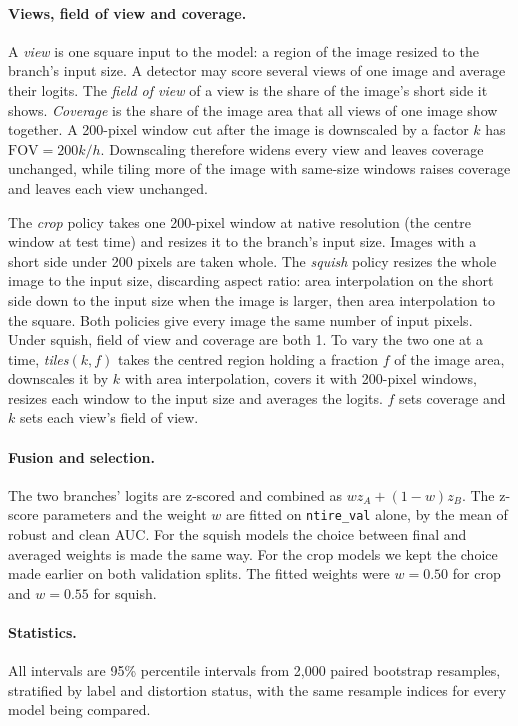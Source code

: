 \documentclass[letterpaper]{article} %
\newcommand{\fov}{\mathrm{FOV}}
\begin{document}
\paragraph{Views, field of view and coverage.} A \emph{view} is one
square input to the model: a region of the image resized to the branch's input
size. A detector may score several views of one image and average their
logits. The \emph{field of view} of a view is the share of the image's short
side it shows. \emph{Coverage} is the share of the image area that all views
of one image show together. A 200-pixel window cut after the image is
downscaled by a factor $k$ has $\fov = 200k/h$. Downscaling therefore widens
every view and leaves coverage unchanged, while tiling more of the image with
same-size windows raises coverage and leaves each view unchanged.

The \emph{crop} policy takes one 200-pixel window at native resolution (the
centre window at test time) and resizes it to the branch's input size. Images
with a short side under 200 pixels are taken whole. The \emph{squish} policy
resizes the whole image to the input size, discarding aspect ratio: area
interpolation on the short side down to the input size when the image is
larger, then area interpolation to the square. Both policies give every image
the same number of input pixels. Under squish, field of view and coverage are
both 1. To vary the two one at a time, \emph{tiles}$(k, f)$ takes the centred
region holding a fraction $f$ of the image area, downscales it by $k$ with
area interpolation, covers it with 200-pixel windows, resizes each window to
the input size and averages the logits. $f$ sets coverage and $k$ sets each
view's field of view.

\paragraph{Fusion and selection.} The two branches' logits are z-scored and
combined as $w z_A + (1-w) z_B$. The z-score parameters and the weight $w$ are
fitted on \texttt{ntire\_val} alone, by the mean of robust and clean AUC. For
the squish models the choice between final and averaged weights is made the
same way. For the crop models we kept the choice made earlier on both
validation splits. The fitted weights were $w = 0.50$ for crop and $w = 0.55$
for squish.

\paragraph{Statistics.} All intervals are 95\% percentile intervals from 2,000
paired bootstrap resamples, stratified by label and distortion status, with
the same resample indices for every model being compared.
\end{document}
